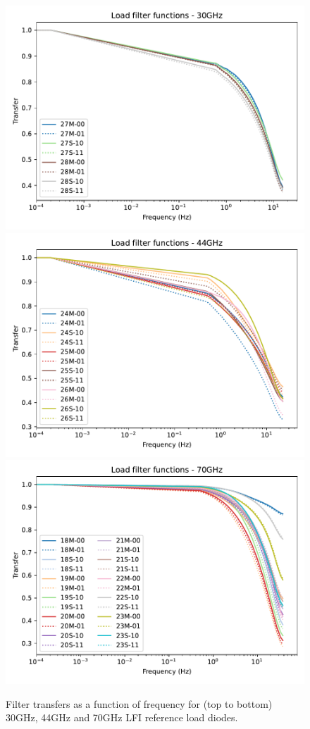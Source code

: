 \documentclass[twocolumn]{aa}
\begin{document}
\begin{figure}[t]
  \center
  \includegraphics[width=\linewidth]{scripts/load_filters_30.pdf}\\
  \includegraphics[width=\linewidth]{scripts/load_filters_44.pdf}\\
  \includegraphics[width=\linewidth]{scripts/load_filters_70.pdf}
  \caption{Filter transfers as a function of frequency for (top to bottom) 30GHz, 44GHz and 70GHz LFI reference load diodes. 
  }\label{fig:refFilters}
\end{figure}
\end{document}
